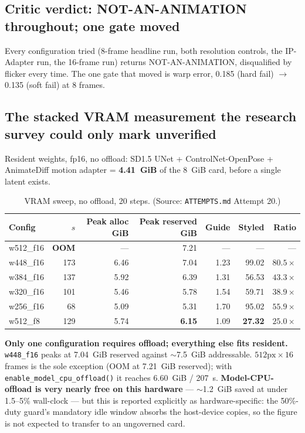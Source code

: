 \documentclass[11pt]{article}
\begin{document}
\subsection{Critic verdict: NOT-AN-ANIMATION throughout; one gate moved}
\label{sec:critic-a20}

Every configuration tried (8-frame headline run, both resolution
controls, the IP-Adapter run, the 16-frame run) returns
NOT-AN-ANIMATION, disqualified by flicker every time. The one gate that
moved is warp error, 0.185 (hard fail) $\rightarrow$ 0.135 (soft fail) at
8 frames.

\subsection{The stacked VRAM measurement the research survey could only mark unverified}
\label{sec:vram-stacked}

Resident weights, fp16, no offload: SD1.5 UNet + ControlNet-OpenPose +
AnimateDiff motion adapter = \textbf{4.41~GiB} of the 8~GiB card, before
a single latent exists.

\begin{table}[h]
\centering
\small
\caption{VRAM sweep, no offload, 20 steps. (Source: \texttt{ATTEMPTS.md} Attempt 20.)}
\label{tab:vramsweep}
\begin{tabular}{@{}lrrrrrr@{}}
\toprule
Config & $s$ & Peak alloc GiB & Peak reserved GiB & Guide & Styled & Ratio \\
\midrule
w512\_f16 & \textbf{OOM} & --- & 7.21 & --- & --- & --- \\
w448\_f16 & 173 & 6.46 & 7.04 & 1.23 & 99.02 & $80.5\times$ \\
w384\_f16 & 137 & 5.92 & 6.39 & 1.31 & 56.53 & $43.3\times$ \\
w320\_f16 & 101 & 5.46 & 5.78 & 1.54 & 59.71 & $38.9\times$ \\
w256\_f16 & 68 & 5.09 & 5.31 & 1.70 & 95.02 & $55.9\times$ \\
w512\_f8 & 129 & 5.74 & \textbf{6.15} & 1.09 & \textbf{27.32} & $\mathbf{25.0\times}$ \\
\bottomrule
\end{tabular}
\end{table}

\textbf{Only one configuration requires offload; everything else fits
resident.} \texttt{w448\_f16} peaks at 7.04~GiB reserved against
$\sim$7.5~GiB addressable. $512\text{px}\times16$ frames is the sole
exception (OOM at 7.21~GiB reserved); with
\texttt{enable\_model\_cpu\_offload()} it reaches 6.60~GiB / 207~s.
\textbf{Model-CPU-offload is very nearly free on this hardware} ---
$\sim$1.2~GiB saved at under 1.5--5\% wall-clock --- but this is reported
explicitly as hardware-specific: the 50\%-duty guard's mandatory idle
window absorbs the host-device copies, so the figure is not expected to
transfer to an ungoverned card.
\end{document}

